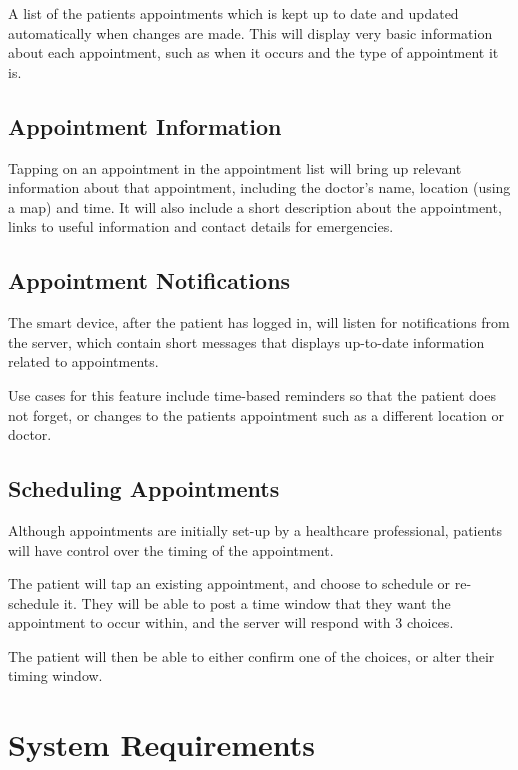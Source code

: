 A list of the patients appointments which is kept up to date and updated automatically when changes are made. This will display very basic information about each appointment, such as when it occurs and the type of appointment it is.

\subsection{Appointment Information}

Tapping on an appointment in the appointment list will bring up relevant information about that appointment, including the doctor's name, location (using a map) and time. It will also include a short description about the appointment, links to useful information and contact details for emergencies.

\subsection{Appointment Notifications}

The smart device, after the patient has logged in, will listen for notifications from the server, which contain short messages that displays up-to-date information related to appointments. 

Use cases for this feature include time-based reminders so that the patient does not forget, or changes to the patients appointment such as a different location or doctor.

\subsection{Scheduling Appointments}

Although appointments are initially set-up by a healthcare professional, patients will have control over the timing of the appointment. 

The patient will tap an existing appointment, and choose to schedule or re-schedule it. They will be able to post a time window that they want the appointment to occur within, and the server will respond with 3 choices. 

The patient will then be able to either confirm one of the choices, or alter their timing window.


\section{System Requirements}


